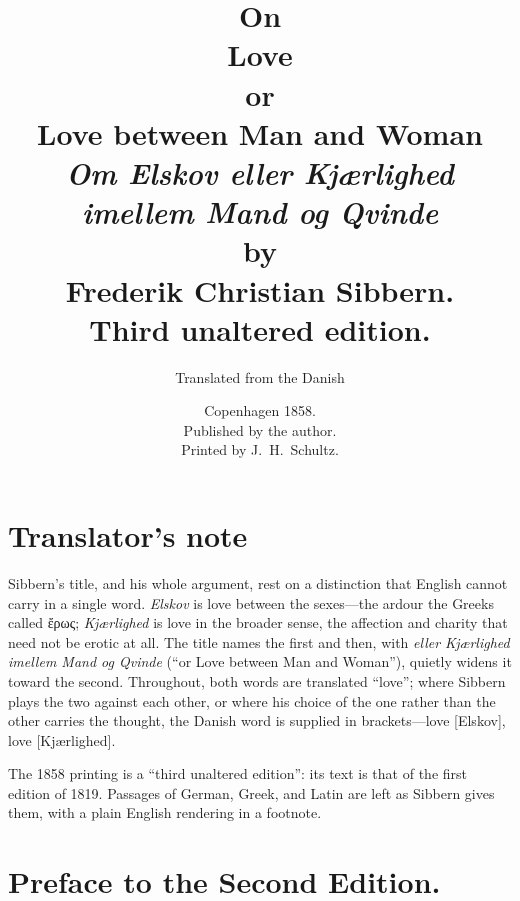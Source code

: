 \documentclass[12pt,a4paper]{book}
\title{\textbf{On}\\[6pt]
  \Huge\textbf{Love}\\[6pt]
  \large or\\[6pt]
  \Large\textbf{Love between Man and Woman}\\[10pt]
  \normalsize\textit{Om Elskov eller Kjærlighed imellem Mand og Qvinde}\\[10pt]
  \normalsize by\\[6pt]
  \large Frederik Christian Sibbern.\\[16pt]
  \normalsize Third unaltered edition.}
\author{\small Translated from the Danish}
\date{Copenhagen 1858.\\
  Published by the author.\\
  Printed by J.\ H.\ Schultz.}
\begin{document}
\maketitle
\thispagestyle{empty}
\cleardoublepage

\thispagestyle{empty}
\chapter*{Translator's note}

Sibbern's title, and his whole argument, rest on a distinction that
English cannot carry in a single word. \textit{Elskov} is love between
the sexes---the ardour the Greeks called ἔρως; \textit{Kjærlighed}
is love in the broader sense, the affection and charity that need not
be erotic at all. The title names the first and then, with
\textit{eller Kjærlighed imellem Mand og Qvinde} (``or Love between Man
and Woman''), quietly widens it toward the second. Throughout, both
words are translated ``love''; where Sibbern plays the two against each
other, or where his choice of the one rather than the other carries the
thought, the Danish word is supplied in brackets---love [Elskov], love
[Kjærlighed].

The 1858 printing is a ``third unaltered edition'': its text is that of
the first edition of 1819. Passages of German, Greek, and Latin are left
as Sibbern gives them, with a plain English rendering in a footnote.

\chapter*{Preface to the Second Edition.}
\end{document}
